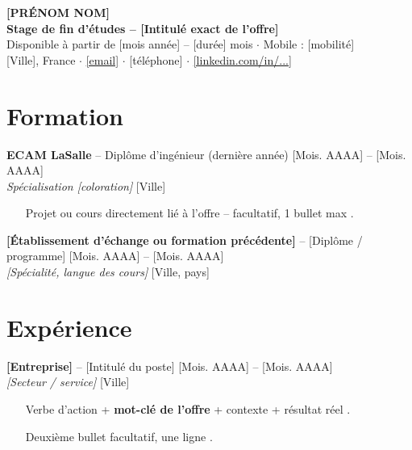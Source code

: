 \documentclass[11pt,a4paper]{article}
\begin{document}
\pagestyle{empty}
\color{darkgray}

\begin{center}
    {\Huge \bfseries \color{mainblue} [PRÉNOM NOM]} \\ \vspace{6pt}
    {\large \textbf{Stage de fin d'études -- [Intitulé exact de l'offre]}} \\ \vspace{2pt}
    \small Disponible à partir de [mois année] -- [durée] mois $\cdot$ Mobile : [mobilité] \\ \vspace{6pt}
    \small [Ville], France $\cdot$ \href{mailto:[email]}{[email]} $\cdot$ [téléphone] $\cdot$ \href{[URL LinkedIn]}{[linkedin.com/in/...]}
\end{center}

\section{Formation}

\noindent
\textbf{ECAM LaSalle} -- Diplôme d'ingénieur (dernière année) \hfill [Mois. AAAA] -- [Mois. AAAA] \\
\textit{Spécialisation [coloration]} \hfill [Ville]
\begin{itemize}
    \item [Projet ou cours directement lié à l'offre -- facultatif, 1 bullet max].
\end{itemize}

\vspace{4pt}

\noindent
\textbf{[Établissement d'échange ou formation précédente]} -- [Diplôme / programme] \hfill [Mois. AAAA] -- [Mois. AAAA] \\
\textit{[Spécialité, langue des cours]} \hfill [Ville, pays]

\section{Expérience}

\noindent
\textbf{[Entreprise]} -- [Intitulé du poste] \hfill [Mois. AAAA] -- [Mois. AAAA] \\
\textit{[Secteur / service]} \hfill [Ville]
\begin{itemize}
    \item [Verbe d'action + \textbf{mot-clé de l'offre} + contexte + résultat réel].
    \item [Deuxième bullet facultatif, une ligne].
\end{itemize}
\end{document}
